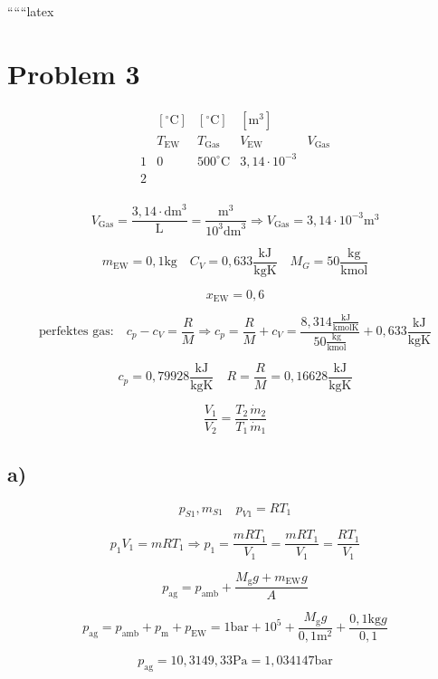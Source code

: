 
``````latex


\section*{Problem 3}

\[
\begin{array}{cccc}
 & [^\circ \text{C}] & [^\circ \text{C}] & [\text{m}^3] \\
 & T_{\text{EW}} & T_{\text{Gas}} & V_{\text{EW}} & V_{\text{Gas}} \\
1 & 0 & 500^\circ \text{C} & 3,14 \cdot 10^{-3} \\
2 & & & \\
\end{array}
\]

\[
V_{\text{Gas}} = \frac{3,14 \cdot \text{dm}^3}{\text{L}} = \frac{\text{m}^3}{10^3 \text{dm}^3} \Rightarrow V_{\text{Gas}} = 3,14 \cdot 10^{-3} \text{m}^3
\]

\[
m_{\text{EW}} = 0,1 \text{kg} \quad C_V = 0,633 \frac{\text{kJ}}{\text{kgK}} \quad M_G = 50 \frac{\text{kg}}{\text{kmol}}
\]

\[
x_{\text{EW}} = 0,6
\]

\[
\text{perfektes gas:} \quad c_p - c_V = \frac{R}{M} \Rightarrow c_p = \frac{R}{M} + c_V = \frac{8,314 \frac{\text{kJ}}{\text{kmolK}}}{50 \frac{\text{kg}}{\text{kmol}}} + 0,633 \frac{\text{kJ}}{\text{kgK}}
\]

\[
c_p = 0,79928 \frac{\text{kJ}}{\text{kgK}} \quad R = \frac{R}{M} = 0,16628 \frac{\text{kJ}}{\text{kgK}}
\]

\[
\frac{V_1}{V_2} = \frac{T_2}{T_1} \frac{\dot{m}_2}{\dot{m}_1}
\]

\subsection*{a)}

\[
p_{S1}, m_{S1} \quad p_{V1} = RT_1
\]

\[
p_1 V_1 = m R T_1 \Rightarrow p_1 = \frac{m R T_1}{V_1} = \frac{m R T_1}{V_1} = \frac{R T_1}{V_1}
\]

\[
p_{\text{ag}} = p_{\text{amb}} + \frac{M_{\text{g}} g + m_{\text{EW}} g}{A}
\]

\[
p_{\text{ag}} = p_{\text{amb}} + p_{\text{m}} + p_{\text{EW}} = 1 \text{bar} + 10^5 + \frac{M_{\text{g}} g}{0,1 \text{m}^2} + \frac{0,1 \text{kg} g}{0,1}
\]

\[
p_{\text{ag}} = 10,3149,33 \text{Pa} = 1,034147 \text{bar}
\]


